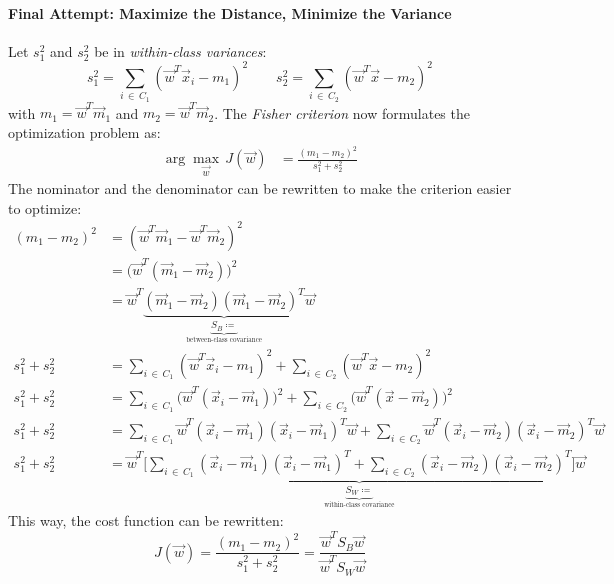 			\paragraph{Final Attempt: Maximize the Distance, Minimize the Variance}
				Let \( s_1^2 \) and \( s_2^2 \) be in \emph{within-class variances}:
				\begin{equation}
					s_1^2 = \sum_{i \,\in\, C_1} (\vec{w}^T \vec{x}_i - m_1)^2 \qquad s_2^2 = \sum_{i \,\in\, C_2} (\vec{w}^T \vec{x} - m_2)^2
				\end{equation}
				with \( m_1 = \vec{w}^T \vec{m}_1 \) and \( m_2 = \vec{w}^T \vec{m}_2 \). The \emph{Fisher criterion} now formulates the optimization problem as:
				\begin{align}
					\arg\max\limits_{\vec{w}} \, J(\vec{w}) &= \frac{(m_1 - m_2)^2}{s_1^2 + s_2^2}
				\end{align}
				The nominator and the denominator can be rewritten to make the criterion easier to optimize:
				\begin{align}
					(m_1 - m_2)^2 &= (\vec{w}^T \vec{m}_1 - \vec{w}^T \vec{m}_2)^2 \\
						&= \big(\vec{w}^T (\vec{m}_1 - \vec{m}_2)\big)^2 \\
						&= \vec{w}^T \underbrace{(\vec{m}_1 - \vec{m}_2) (\vec{m}_1 - \vec{m}_2)^T}_{\underbrace{S_B \coloneqq}_{\textrm{between-class covariance}}} \vec{w} \\
					s_1^2 + s_2^2 &= \sum_{i \,\in\, C_1} (\vec{w}^T \vec{x}_i - m_1)^2 + \sum_{i \,\in\, C_2} (\vec{w}^T \vec{x} - m_2)^2 \\
					s_1^2 + s_2^2 &= \sum_{i \,\in\, C_1} \big(\vec{w}^T (\vec{x}_i - \vec{m}_1)\big)^2 + \sum_{i \,\in\, C_2} \big(\vec{w}^T (\vec{x} - \vec{m}_2)\big)^2 \\
					s_1^2 + s_2^2 &= \sum_{i \,\in\, C_1} \vec{w}^T (\vec{x}_i - \vec{m}_1) (\vec{x}_i - \vec{m}_1)^T \vec{w} + \sum_{i \,\in\, C_2} \vec{w}^T (\vec{x}_i - \vec{m}_2) (\vec{x}_i - \vec{m}_2)^T \vec{w} \\
					s_1^2 + s_2^2 &= \vec{w}^T \underbrace{\Bigg[ \sum_{i \,\in\, C_1} (\vec{x}_i - \vec{m}_1) (\vec{x}_i - \vec{m}_1)^T + \sum_{i \,\in\, C_2} (\vec{x}_i - \vec{m}_2) (\vec{x}_i - \vec{m}_2)^T \Bigg]}_{\underbrace{S_W \coloneqq}_{\textrm{within-class covariance}}} \vec{w}
				\end{align}
				This way, the cost function can be rewritten:
				\begin{equation}
					J(\vec{w}) = \frac{(m_1 - m_2)^2}{s_1^2 + s_2^2} = \frac{\vec{w}^T S_B \vec{w}}{\vec{w}^T S_W \vec{w}}
				\end{equation}
